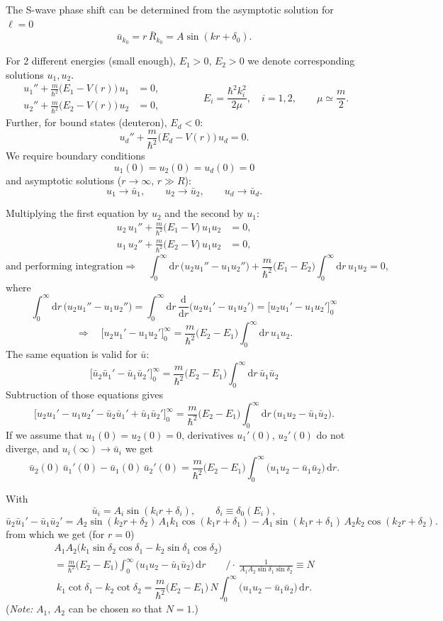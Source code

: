 \documentclass[11pt,a4paper]{article}
\newcommand{\ud}{\mathrm{d}}
\begin{document}
The S-wave phase shift can be determined from the asymptotic solution for $\ell=0$
\[
\bar u_{k_0}=r\,\bar R_{k_0}=A\sin(kr+\delta_0).
\]

For 2 different energies (small enough), $E_1>0$, $E_2>0$ we denote corresponding solutions $u_1, u_2$.
\[
\begin{aligned}
u_1''+\frac{m}{\hbar^2}\big(E_1-V(r)\big)\,u_1&=0,\\
u_2''+\frac{m}{\hbar^2}\big(E_2-V(r)\big)\,u_2&=0,
\end{aligned}
\qquad\qquad
E_i=\frac{\hbar^2k_i^2}{2\mu},\quad i=1,2,\qquad \mu\simeq\frac m2 .
\]
Further, for bound states (deuteron), $E_d<0$:
\[
u_d''+\frac{m}{\hbar^2}\big(E_d-V(r)\big)\,u_d=0 .
\]
We require boundary conditions
\[
u_1(0)=u_2(0)=u_d(0)=0
\]
and asymptotic solutions ($r\to\infty$, $r\gg R$):
\[
u_1\to\bar u_1,\qquad u_2\to\bar u_2,\qquad u_d\to\bar u_d .
\]

Multiplying the first equation by $u_2$ and the second by $u_1$:
\[
\begin{aligned}
u_2\,u_1''+\frac{m}{\hbar^2}\big(E_1-V\big)\,u_1u_2&=0,\\
u_1\,u_2''+\frac{m}{\hbar^2}\big(E_2-V\big)\,u_1u_2&=0,
\end{aligned}
\]
\[
\text{and performing integration} 
\Rightarrow\quad
\int_0^\infty\!\ud r\,\big(u_2u_1''-u_1u_2''\big)
+\frac{m}{\hbar^2}\big(E_1-E_2\big)\int_0^\infty\!\ud r\,u_1u_2=0,
\]
where
\[
\int_0^\infty\!\ud r\,\big(u_2u_1''-u_1u_2''\big)
=\int_0^\infty\!\ud r\,\frac{\ud}{\ud r}\big(u_2u_1'-u_1u_2'\big)
=\Big[u_2u_1'-u_1u_2'\Big]_0^\infty
\]
\[
\Rightarrow\quad
\Big[u_2u_1'-u_1u_2'\Big]_0^\infty=\frac{m}{\hbar^2}\big(E_2-E_1\big)\int_0^\infty\!\ud r\,u_1u_2 .
\]
The same equation is valid for $\bar u$:
\[
\Big[\bar u_2\bar u_1'-\bar u_1\bar u_2'\Big]_0^\infty
=\frac{m}{\hbar^2}\big(E_2-E_1\big)\int_0^\infty\!\ud r\,\bar u_1\bar u_2
\]
Subtruction of those equations gives 
\[
\Big[u_2u_1'-u_1u_2'-\bar u_2\bar u_1'+\bar u_1\bar u_2'\Big]_0^\infty
=\frac{m}{\hbar^2}\big(E_2-E_1\big)\int_0^\infty\!\ud r\,\big(u_1u_2-\bar u_1\bar u_2\big).
\]
If we assume that $u_1(0)=u_2(0)=0$, derivatives $u_1'(0)$, $u_2'(0)$ do not diverge, and $u_i(\infty)\to\bar u_i$ we get 
\[
\bar u_2(0)\,\bar u_1'(0)-\bar u_1(0)\,\bar u_2'(0)
=\frac{m}{\hbar^2}\big(E_2-E_1\big)\int_0^\infty\big(u_1u_2-\bar u_1\bar u_2\big)\,\ud r .
\]

With
\[
\bar u_i=A_i\sin(k_ir+\delta_i),\qquad \delta_i\equiv\delta_0(E_i),
\]
\[
\bar u_2\bar u_1'-\bar u_1\bar u_2'
=A_2\sin(k_2r+\delta_2)\,A_1k_1\cos(k_1r+\delta_1)
-A_1\sin(k_1r+\delta_1)\,A_2k_2\cos(k_2r+\delta_2).
\]
from which we get (for $r=0$)
\begin{multline*}
A_1A_2\big(k_1\sin\delta_2\cos\delta_1-k_2\sin\delta_1\cos\delta_2\big)\\
=\frac{m}{\hbar^2}\big(E_2-E_1\big)\int_0^\infty\big(u_1u_2-\bar u_1\bar u_2\big)\,\ud r
\qquad\Big/\cdot\ \frac{1}{A_1A_2\sin\delta_1\sin\delta_2}\equiv N
\end{multline*}
\[
k_1\cot\delta_1-k_2\cot\delta_2
=\frac{m}{\hbar^2}\big(E_2-E_1\big)\,N\int_0^\infty\big(u_1u_2-\bar u_1\bar u_2\big)\,\ud r .
\]
(\emph{Note:} $A_1$, $A_2$ can be chosen so that $N=1$.)
\end{document}

